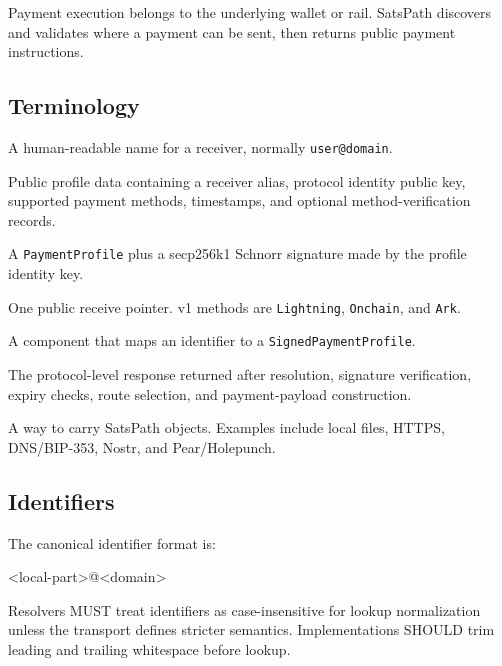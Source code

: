 \documentclass[
]{article}
\newenvironment{Shaded}{}{}
\newcommand{\NormalTok}[1]{#1}
\providecommand{\tightlist}{%
  \setlength{\itemsep}{0pt}\setlength{\parskip}{0pt}}
\begin{document}
Payment execution belongs to the underlying wallet or rail. SatsPath
discovers and validates where a payment can be sent, then returns public
payment instructions.

\hypertarget{terminology}{%
\subsection{Terminology}\label{terminology}}

\begin{description}
\tightlist
\item[\texttt{Identifier}]
A human-readable name for a receiver, normally \texttt{user@domain}.
\item[\texttt{PaymentProfile}]
Public profile data containing a receiver alias, protocol identity
public key, supported payment methods, timestamps, and optional
method-verification records.
\item[\texttt{SignedPaymentProfile}]
A \texttt{PaymentProfile} plus a secp256k1 Schnorr signature made by the
profile identity key.
\item[\texttt{PaymentMethod}]
One public receive pointer. v1 methods are \texttt{Lightning},
\texttt{Onchain}, and \texttt{Ark}.
\item[\texttt{Resolver}]
A component that maps an identifier to a \texttt{SignedPaymentProfile}.
\item[\texttt{QuoteResponse}]
The protocol-level response returned after resolution, signature
verification, expiry checks, route selection, and payment-payload
construction.
\item[\texttt{Transport}]
A way to carry SatsPath objects. Examples include local files, HTTPS,
DNS/BIP-353, Nostr, and Pear/Holepunch.
\end{description}

\hypertarget{identifiers}{%
\subsection{Identifiers}\label{identifiers}}

The canonical identifier format is:

\begin{Shaded}
\begin{Highlighting}[]
\NormalTok{\textless{}local{-}part\textgreater{}@\textless{}domain\textgreater{}}
\end{Highlighting}
\end{Shaded}

Resolvers MUST treat identifiers as case-insensitive for lookup
normalization unless the transport defines stricter semantics.
Implementations SHOULD trim leading and trailing whitespace before
lookup.
\end{document}
